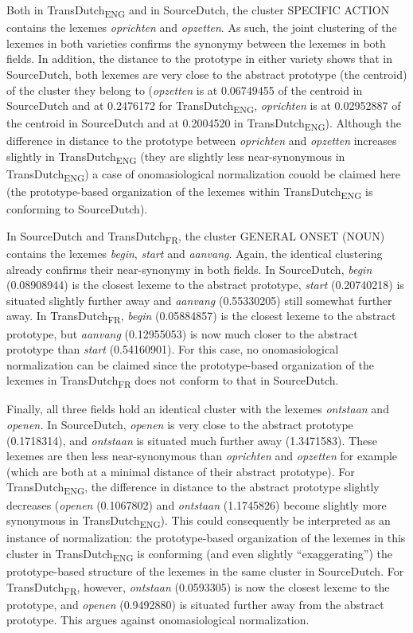 Both in TransDutch\textsubscript{ENG} and in SourceDutch, the cluster {SPECIFIC} ACTION contains the lexemes \textit{oprichten} and \textit{opzetten}. As such, the joint clustering of the lexemes in both varieties confirms the synonymy between the lexemes in both fields. In addition, the distance to the prototype in either variety shows that in SourceDutch, both lexemes are very close to the abstract prototype (the centroid) of the cluster they belong to (\textit{opzetten} is at 0.06749455 of the centroid in SourceDutch and at 0.2476172 for TransDutch\textsubscript{ENG}, \textit{oprichten} is at 0.02952887 of the centroid in SourceDutch and at 0.2004520 in TransDutch\textsubscript{ENG}). Although the difference in distance to the prototype between \textit{oprichten} and \textit{opzetten} increases slightly in TransDutch\textsubscript{ENG} (they are slightly less near-synonymous in TransDutch\textsubscript{ENG})\textsubscript{} a case of onomasiological normalization couold be claimed here (the prototype-based organization of the lexemes within TransDutch\textsubscript{ENG} is conforming to SourceDutch).

In SourceDutch and TransDutch\textsubscript{FR}, the cluster GENERAL ONSET (NOUN) contains the lexemes \textit{begin}, \textit{start} and \textit{aanvang}. Again, the identical clustering already confirms their near-synonymy in both fields. In SourceDutch, \textit{begin} (0.08908944) is the closest lexeme to the abstract prototype, \textit{start} (0.20740218) is situated slightly further away and \textit{aanvang} (0.55330205) still somewhat further away. In TransDutch\textsubscript{FR}, \textit{begin} (0.05884857) is the closest lexeme to the abstract prototype, but \textit{aanvang} (0.12955053) is now much closer to the abstract prototype than \textit{start} (0.54160901). For this case, no onomasiological normalization can be claimed since the prototype-based organization of the lexemes in TransDutch\textsubscript{FR} does not conform to that in SourceDutch.

Finally, all three fields hold an identical cluster with the lexemes \textit{ontstaan} and \textit{openen.} In SourceDutch, \textit{openen} is very close to the abstract prototype (0.1718314), and \textit{ontstaan} is situated much further away (1.3471583). These lexemes are then less near-synonymous than \textit{oprichten} and \textit{opzetten} for example (which are both at a minimal distance of their abstract prototype). For TransDutch\textsubscript{ENG}, the difference in distance to the abstract prototype slightly decreases (\textit{openen} (0.1067802) and \textit{ontstaan} (1.1745826) become slightly more synonymous in TransDutch\textsubscript{ENG}). This could consequently be interpreted as an instance of normalization: the prototype-based organization of the lexemes in this cluster in TransDutch\textsubscript{ENG} is conforming (and even slightly ``exaggerating'') the prototype-based structure of the lexemes in the same cluster in SourceDutch. For TransDutch\textsubscript{FR}, however, \textit{ontstaan} (0.0593305) is now the closest lexeme to the prototype, and \textit{openen} (0.9492880) is situated further away from the abstract prototype. This argues against onomasiological normalization.

